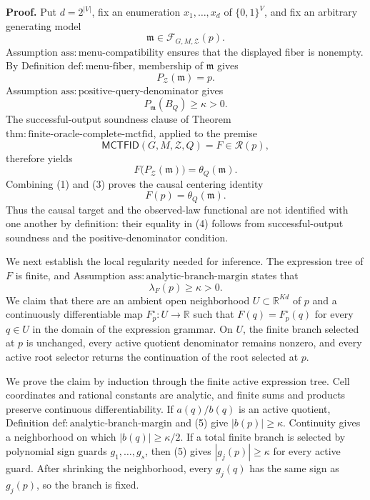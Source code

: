 \textbf{Proof.}
Put \(d=2^{|V|}\), fix an enumeration \(x_1,\ldots,x_d\) of \(\{0,1\}^{V}\), and fix an arbitrary generating model
\[
 \mathfrak m\in\mathcal F_{G,M,\mathcal Z}(p).
\]
Assumption \(\mathrm{ass:menu\text{-}compatibility}\) ensures that the displayed fiber is nonempty.  By Definition \(\mathrm{def:menu\text{-}fiber}\), membership of \(\mathfrak m\) gives
\[
 P_{\mathcal Z}(\mathfrak m)=p. \tag{1}
\]
Assumption \(\mathrm{ass:positive\text{-}query\text{-}denominator}\) gives
\[
 P_{\mathfrak m}(B_Q)\geq\kappa>0. \tag{2}
\]
The successful-output soundness clause of Theorem \(\mathrm{thm:finite\text{-}oracle\text{-}complete\text{-}mctfid}\), applied to the premise
\[
 \mathsf{MCTFID}(G,M,\mathcal Z,Q)=F\in\mathcal R(p),
\]
therefore yields
\[
 F\bigl(P_{\mathcal Z}(\mathfrak m)\bigr)=\theta_Q(\mathfrak m). \tag{3}
\]
Combining (1) and (3) proves the causal centering identity
\[
 F(p)=\theta_Q(\mathfrak m). \tag{4}
\]
Thus the causal target and the observed-law functional are not identified with one another by definition: their equality in (4) follows from successful-output soundness and the positive-denominator condition.

We next establish the local regularity needed for inference.  The expression tree of \(F\) is finite, and Assumption \(\mathrm{ass:analytic\text{-}branch\text{-}margin}\) states that
\[
 \lambda_F(p)\geq\kappa>0. \tag{5}
\]
We claim that there are an ambient open neighborhood \(U\subset\mathbb R^{Kd}\) of \(p\) and a continuously differentiable map \(F_p^{\circ}:U\to\mathbb R\) such that \(F(q)=F_p^{\circ}(q)\) for every \(q\in U\) in the domain of the expression grammar.  On \(U\), the finite branch selected at \(p\) is unchanged, every active quotient denominator remains nonzero, and every active root selector returns the continuation of the root selected at \(p\).

We prove the claim by induction through the finite active expression tree.  Cell coordinates and rational constants are analytic, and finite sums and products preserve continuous differentiability.  If \(a(q)/b(q)\) is an active quotient, Definition \(\mathrm{def:analytic\text{-}branch\text{-}margin}\) and (5) give \(|b(p)|\geq\kappa\).  Continuity gives a neighborhood on which \(|b(q)|\geq\kappa/2\).  If a total finite branch is selected by polynomial sign guards \(g_1,\ldots,g_s\), then (5) gives \(|g_j(p)|\geq\kappa\) for every active guard.  After shrinking the neighborhood, every \(g_j(q)\) has the same sign as \(g_j(p)\), so the branch is fixed.

